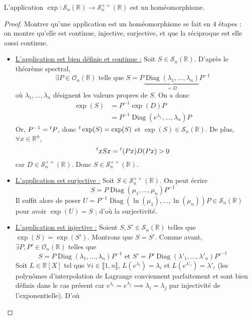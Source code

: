 	\begin{theorem}
		L'application $\exp : \mathcal{S}_n(\mathbb{R}) \rightarrow \mathcal{S}^{++}_n(\mathbb{R})$ est un homéomorphisme.
	\end{theorem}

	\begin{proof}
		Montrer qu'une application est un homéomorphisme se fait en $4$ étapes : on montre qu'elle est continue, injective, surjective, et que la réciproque est elle aussi continue.
		\begin{itemize}
			\item \uline{L'application est bien définie et continue :} Soit $S \in \mathcal{S}_n(\mathbb{R})$. D'après le théorème spectral,
			\[ \exists P \in \mathcal{O}_n(\mathbb{R}) \text{ telle que } S = P \underbrace{\operatorname{Diag}(\lambda_1, \dots, \lambda_n)}_{= D}P^{-1} \]
			où $\lambda_1, \dots, \lambda_n$ désignent les valeurs propres de $S$. On a donc
			\begin{align*}
				\exp(S) &= P^{-1} \exp(D) P \\
				&= P^{-1} \operatorname{Diag}(e^{\lambda_1}, \dots, \lambda_n) P
			\end{align*}
			Or, $P^{-1} = \mathstrut ^t P$, donc $\mathstrut ^t \exp(S) = \exp(S)$ et $\exp(S) \in \mathcal{S}_n(\mathbb{R})$. De plus, $\forall x \in \mathbb{R}^n$,
			\[ \mathstrut ^t x S x = \mathstrut ^t (Px) D (Px) > 0 \]
			car $D \in \mathcal{S}^{++}_n(\mathbb{R})$. Donc $S \in \mathcal{S}^{++}_n(\mathbb{R})$.
			\item \uline{L'application est surjective :} Soit $S \in \mathcal{S}^{++}_n(\mathbb{R})$. On peut écrire
			\[ S = P \operatorname{Diag}(\mu_1, \dots, \mu_n) P^{-1} \]
			Il suffit alors de poser $U = P^{-1} \operatorname{Diag}(\ln(\mu_1), \dots, \ln(\mu_n)) P \in \mathcal{S}_n(\mathbb{R})$ pour avoir $\exp(U) = S$ ; d'où la surjectivité.
			\item \uline{L'application est injective :} Soient $S, S' \in \mathcal{S}_n(\mathbb{R})$ telles que $\exp(S) = \exp(S')$. Montrons que $S = S'$. Comme avant, $\exists P, P' \in \mathcal{O}_n(\mathbb{R})$ telles que
			\[ S = P \operatorname{Diag}(\lambda_1, \dots, \lambda_n) P^{-1} \text{ et } S' = P' \operatorname{Diag}(\lambda'_1, \dots, \lambda'_n) P'^{-1} \]
			Soit $L \in \mathbb{R}[X]$ tel que $\forall i \in \llbracket 1, n \rrbracket$, $L(e^{\lambda_i}) = \lambda_i$ et $L(e^{\lambda'_i}) = \lambda'_i$ (les polynômes d'interpolation de Lagrange conviennent parfaitement et sont bien définis dans le cas présent car $e^{\lambda_i} = e^{\lambda_j} \implies \lambda_i = \lambda_j$ par injectivité de l'exponentielle). D'où

\end{itemize}
\end{proof}
